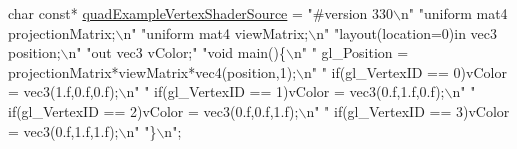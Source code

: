 \begin{DoxyCodeInclude}
\textcolor{keywordtype}{char} \textcolor{keyword}{const}* \hyperlink{quadExample_8c_a237a7e498550119b6ce620c687d56f2e}{quadExampleVertexShaderSource} = 
\textcolor{stringliteral}{"#version 330\(\backslash\)n"}
\textcolor{stringliteral}{"uniform mat4 projectionMatrix;\(\backslash\)n"}
\textcolor{stringliteral}{"uniform mat4 viewMatrix;\(\backslash\)n"}
\textcolor{stringliteral}{"layout(location=0)in vec3 position;\(\backslash\)n"}
\textcolor{stringliteral}{"out vec3 vColor;"}
\textcolor{stringliteral}{"void main()\{\(\backslash\)n"}
\textcolor{stringliteral}{"  gl\_Position = projectionMatrix*viewMatrix*vec4(position,1);\(\backslash\)n"}
\textcolor{stringliteral}{"  if(gl\_VertexID == 0)vColor = vec3(1.f,0.f,0.f);\(\backslash\)n"}
\textcolor{stringliteral}{"  if(gl\_VertexID == 1)vColor = vec3(0.f,1.f,0.f);\(\backslash\)n"}
\textcolor{stringliteral}{"  if(gl\_VertexID == 2)vColor = vec3(0.f,0.f,1.f);\(\backslash\)n"}
\textcolor{stringliteral}{"  if(gl\_VertexID == 3)vColor = vec3(0.f,1.f,1.f);\(\backslash\)n"}
\textcolor{stringliteral}{"\}\(\backslash\)n"};
\end{DoxyCodeInclude}

